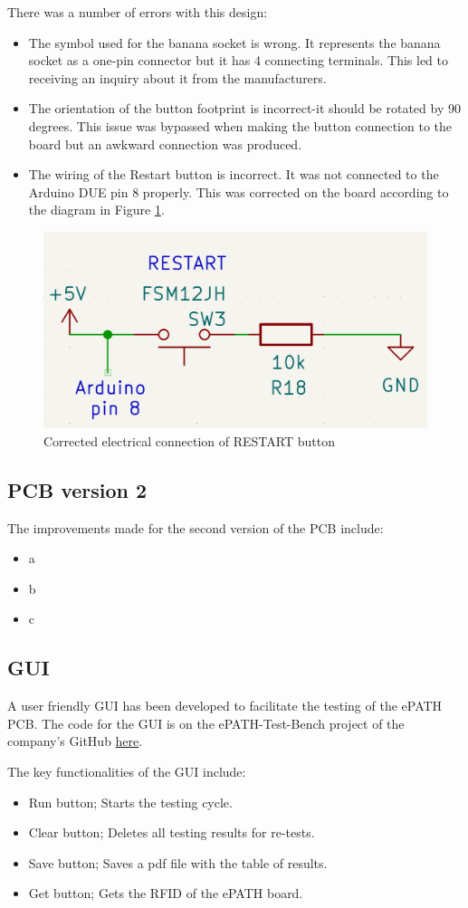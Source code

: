 There was a number of errors with this design:
\begin{itemize}
\item The symbol used for the banana socket is wrong. It represents the banana socket as a one-pin connector but it has 4 connecting terminals. This led to receiving an inquiry about it from the manufacturers.
\item The orientation of the button footprint is incorrect-it should be rotated by 90 degrees. This issue was bypassed when making the button connection to the board but an awkward connection was produced.
\item The wiring of the Restart button is incorrect. It was not connected to the Arduino DUE pin 8 properly. This was corrected on the board according to the diagram in Figure \ref{button_wiring}.
\end{itemize}

\begin{figure}[H]
          \centering
          \includegraphics[width=1\linewidth]{img/button_wiring.png}
          \caption{Corrected electrical connection of RESTART button}
          \label{button_wiring}
    \end{figure}



\subsection{PCB version 2}
The improvements made for the second version of the PCB include:
\begin{itemize}
\item a
\item b
\item c
\end{itemize}




\subsection{GUI}
A user friendly GUI has been developed to facilitate the testing of the ePATH PCB. The code for the GUI is on the ePATH-Test-Bench project of the company's GitHub \href{https://github.com/pathfinder-medical/ePATH-Test-Bench}{here}.

The key functionalities of the GUI include:
\begin{itemize}
\item Run button; Starts the testing cycle.
\item Clear button; Deletes all testing results for re-tests.
\item Save button; Saves a pdf file with the table of results.
\item Get button; Gets the RFID of the ePATH board.
\end{itemize}
